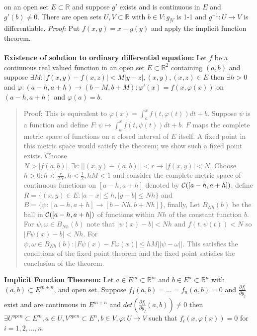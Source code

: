 on an open set $E \subset {\mathbb R}$ and suppose $g'$ exists and is continuous in $E$
and $g'(b) \ne 0$.  There are open sets $U, V \subset {\mathbb R}$ with $b \in V: g_{|V}$
is 1-1 and $g^{-1}: U \rightarrow V$ is differentiable.  \emph{Proof:}  Put
$f(x,y)=x-g(y)$ and apply the implicit function theorem.
\\
\\
{\bf Existence of solution to ordinary differential equation:}  Let $f$ be a continuous
real valued function in an open set $E \subset {\mathbb R}^2$ containing $(a,b)$
and suppose $\exists M: |f(x,y)-f(x,z)|< M|y-z|, (x,y), (x,z) \in E$ then
$\exists h>0$ and $\varphi: (a-h, a+h) \rightarrow (b-M, b+M): \varphi'(x)= f(x,\varphi(x))$
on $(a-h, a+h)$ and $\varphi(a)=b$.  
\begin{quote}
Proof:  This is equivalent to
$\varphi(x)= \int_a^x f(t, \varphi(t)) dt +b$.  Suppose $\psi$ is a function and
define $F: \psi \mapsto \int_a^x f(t, \psi(t)) dt +b$.  $F$ maps the complete
metric space of functions on a closed interval of $E$ itself.  A fixed point in
this metric space would satisfy the theorem; we show such a fixed point exists.
Choose $N > |f(a,b)|, \exists r: ||(x,y)-(a,b)|| <r \rightarrow
|f(x,y)| < N$.  Choose $h>0: h < {\frac r {2N}}, h < {\frac 1 2}, hM < 1$ 
and consider the complete metric
space of continuous functions on $[a-h, a+h]$ denoted by
${\cal C}([a-h, a+h])$; define 
$R= \{ (x,y) \in E: |a-x| \le h, |y-b| \le Nh\}$ and
$B= \{ \psi: [a-h, a+h] \rightarrow [b-Nh, b+Nh] \}$, finally, Let
$B_{Nh}(b)$ be the ball in
${\cal C}([a-h, a+h])$ of functions within $Nh$ of the constant function $b$.
For $\psi, \omega \in B_{Nh}(b)$ note that $|\psi(x)-b| < Nh$ and $f(t,\psi(t))<N$
so $|F \psi (x)-b| < Nh$.
For $\psi, \omega \in B_{Nh}(b): |F \psi (x) - F \omega (x)| \le hM || \psi - \omega ||$.
This satisfies the conditions of the fixed point theorem and the fixed point
satisfies the conclusion of the theorem.
\end{quote}
{\bf Implicit Function Theorem:} Let 
$a \in E^m \subset {\mathbb R}^m$ and
$b \in E^n \subset {\mathbb R}^n$ with $(a,b) \subset E^{m+n}$, and open set.  Suppose
$f_1(a,b)= \ldots = f_n(a,b)=0$ and ${\frac {\partial f_i} {\partial y_j}}$
exist and are continuous in $E^{m+n}$ and 
$det({\frac {\partial f_i} {\partial y_j}}(a,b)) \ne 0$ then 
$\exists U^{open} \subset E^m, a \in U,
V^{open} \subset E^n, b \in V, \varphi: U \rightarrow V$ such that $f_i(x, \varphi(x))=0$
for $i= 1,2, \ldots, n$.  

